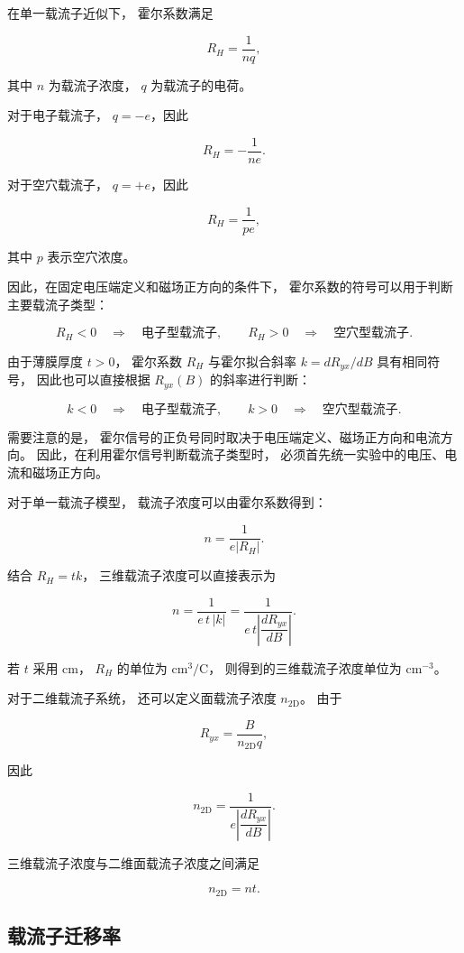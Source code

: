 \documentclass[openany]{book}
\theoremstyle{mydefinition}
\theoremstyle{myplain}
\begin{document}
在单一载流子近似下，
霍尔系数满足

\[
R_H
=
\frac{1}{nq},
\]

其中 \(n\) 为载流子浓度，
\(q\) 为载流子的电荷。

对于电子载流子，
\(q=-e\)，因此

\[
R_H
=
-\frac{1}{ne}.
\]

对于空穴载流子，
\(q=+e\)，因此

\[
R_H
=
\frac{1}{pe},
\]

其中 \(p\) 表示空穴浓度。

因此，在固定电压端定义和磁场正方向的条件下，
霍尔系数的符号可以用于判断主要载流子类型：

\[
R_H<0
\quad\Rightarrow\quad
\text{电子型载流子},
\qquad
R_H>0
\quad\Rightarrow\quad
\text{空穴型载流子}.
\]

由于薄膜厚度 \(t>0\)，
霍尔系数 \(R_H\) 与霍尔拟合斜率
\(k=dR_{yx}/dB\) 具有相同符号，
因此也可以直接根据 \(R_{yx}(B)\) 的斜率进行判断：

\[
k<0
\quad\Rightarrow\quad
\text{电子型载流子},
\qquad
k>0
\quad\Rightarrow\quad
\text{空穴型载流子}.
\]

需要注意的是，
霍尔信号的正负号同时取决于电压端定义、磁场正方向和电流方向。
因此，在利用霍尔信号判断载流子类型时，
必须首先统一实验中的电压、电流和磁场正方向。

对于单一载流子模型，
载流子浓度可以由霍尔系数得到：

\[
n
=
\frac{1}{e|R_H|}.
\]

结合 \(R_H=tk\)，
三维载流子浓度可以直接表示为

\[
n
=
\frac{1}{e\,t\,|k|}
=
\frac{1}
{e\,t\left|\dfrac{dR_{yx}}{dB}\right|}.
\]

若 \(t\) 采用 cm，
\(R_H\) 的单位为 \(\mathrm{cm^3/C}\)，
则得到的三维载流子浓度单位为
\(\mathrm{cm^{-3}}\)。

对于二维载流子系统，
还可以定义面载流子浓度 \(n_{\mathrm{2D}}\)。
由于

\[
R_{yx}
=
\frac{B}{n_{\mathrm{2D}}q},
\]

因此

\[
n_{\mathrm{2D}}
=
\frac{1}
{e\left|\dfrac{dR_{yx}}{dB}\right|}.
\]

三维载流子浓度与二维面载流子浓度之间满足

\[
n_{\mathrm{2D}}
=
nt.
\]


\subsection{载流子迁移率}
\end{document}
